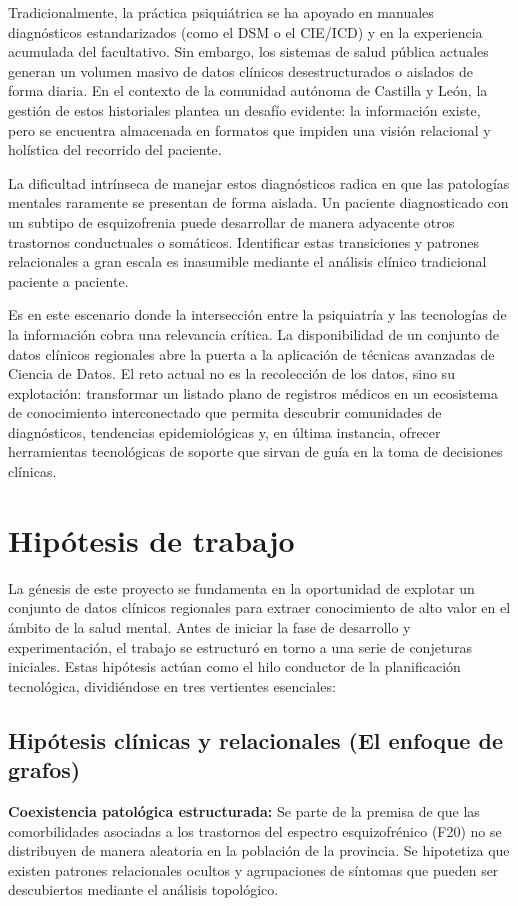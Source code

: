 \documentclass[12pt,a4paper,onecolumn,oneside]{report}
\begin{document}
Tradicionalmente, la práctica psiquiátrica se ha apoyado en manuales diagnósticos estandarizados (como el DSM o el CIE/ICD) y en la experiencia acumulada del facultativo. Sin embargo, los sistemas de salud pública actuales generan un volumen masivo de datos clínicos desestructurados o aislados de forma diaria. En el contexto de la comunidad autónoma de Castilla y León, la gestión de estos historiales plantea un desafío evidente: la información existe, pero se encuentra almacenada en formatos que impiden una visión relacional y holística del recorrido del paciente.

La dificultad intrínseca de manejar estos diagnósticos radica en que las patologías mentales raramente se presentan de forma aislada. Un paciente diagnosticado con un subtipo de esquizofrenia puede desarrollar de manera adyacente otros trastornos conductuales o somáticos. Identificar estas transiciones y patrones relacionales a gran escala es inasumible mediante el análisis clínico tradicional paciente a paciente.

Es en este escenario donde la intersección entre la psiquiatría y las tecnologías de la información cobra una relevancia crítica. La disponibilidad de un conjunto de datos clínicos regionales abre la puerta a la aplicación de técnicas avanzadas de Ciencia de Datos. El reto actual no es la recolección de los datos, sino su explotación: transformar un listado plano de registros médicos en un ecosistema de conocimiento interconectado que permita descubrir comunidades de diagnósticos, tendencias epidemiológicas y, en última instancia, ofrecer herramientas tecnológicas de soporte que sirvan de guía en la toma de decisiones clínicas.

\section{Hipótesis de trabajo}

La génesis de este proyecto se fundamenta en la oportunidad de explotar un conjunto de datos clínicos regionales para extraer conocimiento de alto valor en el ámbito de la salud mental. Antes de iniciar la fase de desarrollo y experimentación, el trabajo se estructuró en torno a una serie de conjeturas iniciales. Estas hipótesis actúan como el hilo conductor de la planificación tecnológica, dividiéndose en tres vertientes esenciales:

\subsection{Hipótesis clínicas y relacionales (El enfoque de grafos)}
    \textbf{Coexistencia patológica estructurada:} Se parte de la premisa de que las comorbilidades asociadas a los trastornos del espectro esquizofrénico (F20) no se distribuyen de manera aleatoria en la población de la provincia. Se hipotetiza que existen patrones relacionales ocultos y agrupaciones de síntomas que pueden ser descubiertos mediante el análisis topológico.
\end{document}
